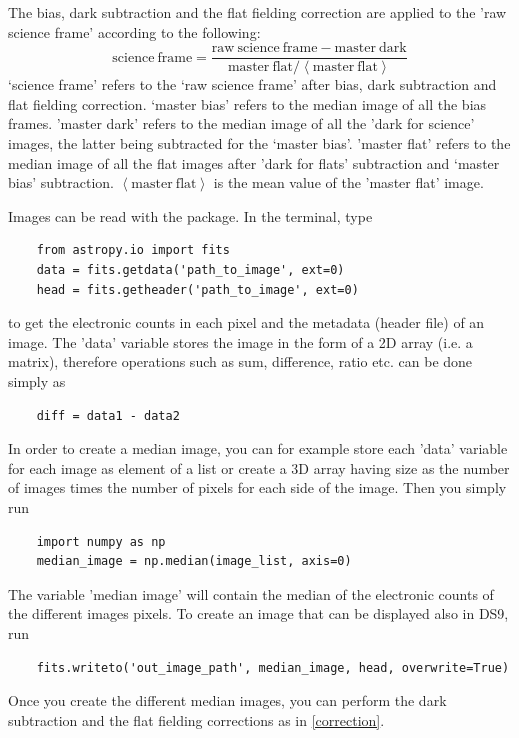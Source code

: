 \documentclass[a4paper, 11pt, fleqn]{memoir}
\begin{document}
The bias, dark subtraction and the flat fielding correction are applied to the 'raw science frame' according to the following:
\begin{equation}
    \mathrm{science\ frame} = \frac{\mathrm{raw\ science\ frame} - \mathrm{master\ dark} }{\mathrm{master\ flat} / \left \langle \mathrm{master\ flat} \right \rangle} \label{correction}
\end{equation}
`science frame' refers to the `raw science frame' after bias, dark subtraction and flat fielding correction.
`master bias' refers to the median image of all the bias frames. 'master dark' refers to the median image of all the 'dark for science' images, the latter being subtracted for the `master bias'. 'master flat' refers to the median image of all the flat images after 'dark for flats' subtraction and `master bias' subtraction. $ \left \langle \mathrm{master\ flat} \right \rangle$ is the mean value of the 'master flat' image.

Images can be read with the  package.
In the terminal, type
\begin{verbatim}
    from astropy.io import fits
    data = fits.getdata('path_to_image', ext=0)
    head = fits.getheader('path_to_image', ext=0)
\end{verbatim}
to get the electronic counts in each pixel and the metadata (header file) of an image.
The 'data' variable stores the image in the form of a 2D array (i.e. a matrix), therefore operations such as sum, difference, ratio etc. can be done simply as
\begin{verbatim}
    diff = data1 - data2
\end{verbatim}

In order to create a median image, you can for example store each 'data' variable for each image as element of a list or create a 3D array having size as the number of images times the number of pixels for each side of the image.
Then you simply run
\begin{verbatim}
    import numpy as np
    median_image = np.median(image_list, axis=0)
\end{verbatim}
The variable 'median image' will contain the median of the electronic counts of the different images pixels.
To create an image that can be displayed also in DS9, run
\begin{verbatim}
    fits.writeto('out_image_path', median_image, head, overwrite=True)
\end{verbatim}

Once you create the different median images, you can perform the dark subtraction and the flat fielding corrections as in \ref{correction}.
\end{document}
